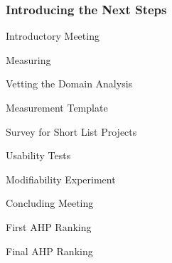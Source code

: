 \documentclass[t,12pt,numbers,fleqn]{beamer}
\begin{document}

\begin{frame}
\frametitle{Introducing the Next Steps} 

\bi
\item Introductory Meeting
\item Measuring
\bi
\item Vetting the Domain Analysis
\item Measurement Template
\item Survey for Short List Projects
\item Usability Tests
\item Modifiability Experiment
\ei
\item Concluding Meeting
\bi
\item First AHP Ranking
\item Final AHP Ranking
\ei
\ei

\end{frame}

\end{document}

